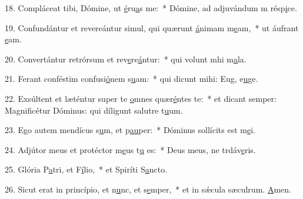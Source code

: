 18. Compláceat tibi, Dómine, ut \uline{é}ru\uline{a}s me:~* Dómine, ad adjuvándum m résp\uline{i}ce.\par 
19. Confundántur et revereántur simul, qui quærunt \uline{á}nimam m\uline{e}am,~* ut áufrant \uline{e}am.\par 
20. Convertántur retrórsum et rev\uline{e}re\uline{á}ntur:~* qui volunt mhi m\uline{a}la.\par 
21. Ferant conféstim confusi\uline{ó}nem s\uline{u}am:~* qui dicunt mihi: Eug, e\uline{u}ge.\par 
22. Exsúltent et læténtur super te \uline{o}mnes quær\uline{é}ntes te:~* et dicant semper: Magnificétur Dóminus: qui díligunt salutre t\uline{u}um.\par 
23. Ego autem mendícus s\uline{u}m, et p\uline{au}per:~* Dóminus sollícits est m\uline{e}i.\par 
24. Adjútor meus et protéctor m\uline{e}us t\uline{u} es:~* Deus meus, ne trdáv\uline{e}ris.\par 
25. Glória P\uline{a}tri, et F\uline{í}lio,~* et Spiríti S\uline{a}ncto.\par 
26. Sicut erat in princípio, et n\uline{u}nc, et s\uline{e}mper,~* et in sǽcula sæculrum. \uline{A}men.\par 
